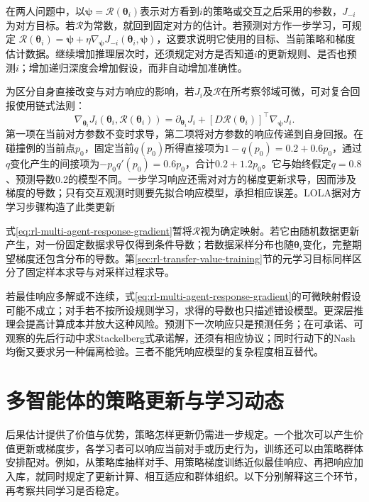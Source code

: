 在两人问题中，以$\bm\psi=\mathcal R(\bm\theta_i)$表示对方看到$i$的策略或交互之后采用的参数，$J_{-i}$为对方目标。若$\mathcal R$为常数，就回到固定对方的估计。若预测对方作一步学习，可规定
$\mathcal R(\bm\theta_i)=\bm\psi+\eta\nabla_{\bm\psi}J_{-i}(\bm\theta_i,\bm\psi)$，这要求说明它使用的目标、当前策略和梯度估计数据。继续增加推理层次时，还须规定对方是否知道$i$的更新规则、是否也预测$i$；增加递归深度会增加假设，而非自动增加准确性。

为区分自身直接改变与对方响应的影响，若$J_i$及$\mathcal R$在所考察邻域可微，可对复合回报使用链式法则：
\begin{equation}
 \nabla_{\bm\theta_i}J_i(\bm\theta_i,\mathcal R(\bm\theta_i))
 =
 \partial_{\bm\theta_i}J_i+
 [D\mathcal R(\bm\theta_i)]^\top
       \nabla_{\bm\psi}J_i.
 \label{eq:rl-multi-agent-response-gradient}
\end{equation}
第一项在当前对方参数不变时求导，第二项将对方参数的响应传递到自身回报。在碰撞例的当前点$p_0$，固定当前$q(p_0)$所得直接项为$1-q(p_0)=0.2+0.6p_0$，通过$q$变化产生的间接项为$-p_0q'(p_0)=0.6p_0$，合计$0.2+1.2p_0$。它与始终假定$q=0.8$、预测导数0.2的模型不同。一步学习响应还需对对方的梯度更新求导，因而涉及梯度的导数；只有交互观测时则要先拟合响应模型，承担相应误差。LOLA据对方学习步骤构造了此类更新

式\eqref{eq:rl-multi-agent-response-gradient}暂将$\mathcal R$视为确定映射。若它由随机数据更新产生，对一份固定数据求导仅得到条件导数；若数据采样分布也随$\bm\theta_i$变化，完整期望梯度还包含分布的导数。第\ref{sec:rl-transfer-value-training}节的元学习目标同样区分了固定样本求导与对采样过程求导。

若最佳响应多解或不连续，式\eqref{eq:rl-multi-agent-response-gradient}的可微映射假设可能不成立；对手若不按所设规则学习，求得的导数也只描述错设模型。更深层推理会提高计算成本并放大这种风险。预测下一次响应只是预测任务；在可承诺、可观察的先后行动中求Stackelberg式承诺解，还须有相应协议；同时行动下的Nash均衡又要求另一种偏离检验。三者不能凭响应模型的复杂程度相互替代。

\section{多智能体的策略更新与学习动态}
\label{sec:rl-multi-agent-learning}

后果估计提供了价值与优势，策略怎样更新仍需进一步规定。一个批次可以产生价值更新或梯度步，各学习者可以响应当前对手或历史行为，训练还可以由策略群体安排配对。例如，从策略库抽样对手、用策略梯度训练近似最佳响应、再把响应加入库，就同时规定了更新计算、相互适应和群体组织。以下分别解释这三个环节，再考察共同学习是否稳定。

